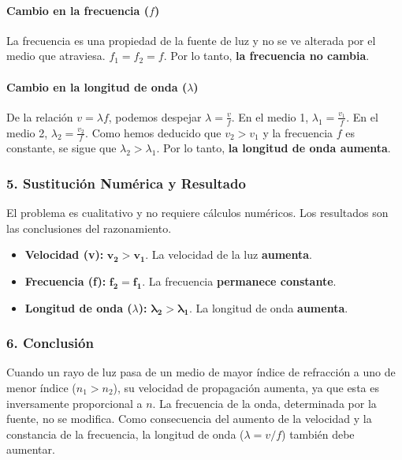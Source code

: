 \paragraph*{Cambio en la frecuencia ($f$)}
La frecuencia es una propiedad de la fuente de luz y no se ve alterada por el medio que atraviesa.
$f_1 = f_2 = f$. Por lo tanto, \textbf{la frecuencia no cambia}.

\paragraph*{Cambio en la longitud de onda ($\lambda$)}
De la relación $v = \lambda f$, podemos despejar $\lambda = \frac{v}{f}$.
En el medio 1, $\lambda_1 = \frac{v_1}{f}$.
En el medio 2, $\lambda_2 = \frac{v_2}{f}$.
Como hemos deducido que $v_2 > v_1$ y la frecuencia $f$ es constante, se sigue que $\lambda_2 > \lambda_1$. Por lo tanto, \textbf{la longitud de onda aumenta}.

\subsubsection*{5. Sustitución Numérica y Resultado}
El problema es cualitativo y no requiere cálculos numéricos. Los resultados son las conclusiones del razonamiento.

\begin{cajaresultado}
\begin{itemize}
    \item \textbf{Velocidad (v):} $\boldsymbol{v_2 > v_1}$. La velocidad de la luz \textbf{aumenta}.
    \item \textbf{Frecuencia (f):} $\boldsymbol{f_2 = f_1}$. La frecuencia \textbf{permanece constante}.
    \item \textbf{Longitud de onda ($\lambda$):} $\boldsymbol{\lambda_2 > \lambda_1}$. La longitud de onda \textbf{aumenta}.
\end{itemize}
\end{cajaresultado}

\subsubsection*{6. Conclusión}
\begin{cajaconclusion}
    Cuando un rayo de luz pasa de un medio de mayor índice de refracción a uno de menor índice ($n_1 > n_2$), su velocidad de propagación aumenta, ya que esta es inversamente proporcional a $n$. La frecuencia de la onda, determinada por la fuente, no se modifica. Como consecuencia del aumento de la velocidad y la constancia de la frecuencia, la longitud de onda ($\lambda = v/f$) también debe aumentar.
\end{cajaconclusion}

